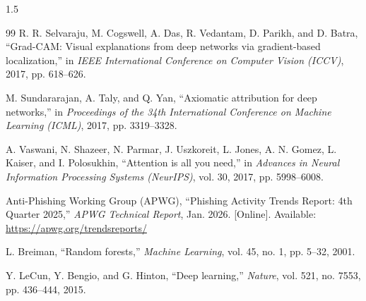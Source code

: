 \begin{spacing}{1.5}
\begin{thebibliography}{99}
 R. R. Selvaraju, M. Cogswell, A. Das, R. Vedantam, D. Parikh, and D. Batra, ``Grad-CAM: Visual explanations from deep networks via gradient-based localization,'' in \textit{IEEE International Conference on Computer Vision (ICCV)}, 2017, pp. 618--626.

 M. Sundararajan, A. Taly, and Q. Yan, ``Axiomatic attribution for deep networks,'' in \textit{Proceedings of the 34th International Conference on Machine Learning (ICML)}, 2017, pp. 3319--3328.

 A. Vaswani, N. Shazeer, N. Parmar, J. Uszkoreit, L. Jones, A. N. Gomez, L. Kaiser, and I. Polosukhin, ``Attention is all you need,'' in \textit{Advances in Neural Information Processing Systems (NeurIPS)}, vol. 30, 2017, pp. 5998--6008.

 Anti-Phishing Working Group (APWG), ``Phishing Activity Trends Report: 4th Quarter 2025,'' \textit{APWG Technical Report}, Jan. 2026. [Online]. Available: \url{https://apwg.org/trendsreports/}

 L. Breiman, ``Random forests,'' \textit{Machine Learning}, vol. 45, no. 1, pp. 5--32, 2001.

 Y. LeCun, Y. Bengio, and G. Hinton, ``Deep learning,'' \textit{Nature}, vol. 521, no. 7553, pp. 436--444, 2015.

\end{thebibliography}
\end{spacing}
